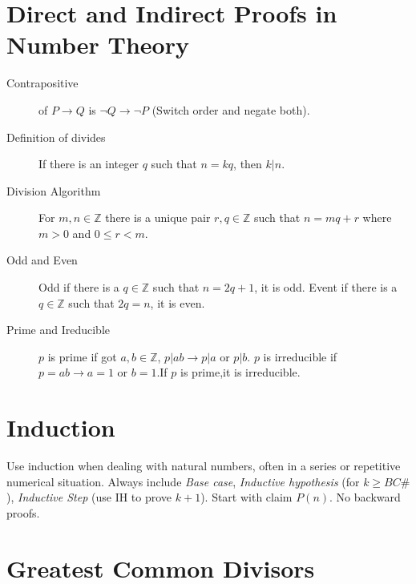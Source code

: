 \documentclass[../main.tex]{subfiles}
\begin{document}
\section{Direct and Indirect Proofs in Number Theory}
\label{sec:direct_and_indirect_proofs_in_number_theory}

\begin{description}
  \item[Contrapositive] of $P\to Q$ is $\neg Q \to \neg P$ (Switch order and
    negate both).
  \item[Definition of divides] If there is an integer $q$ such that $n=kq$,
    then $k|n$.
  \item[Division Algorithm] For $m,n\in\mathbb{Z} $ there is a unique pair
    $r,q\in\mathbb{Z}$ such that $n=mq+r$ where $m>0$ and $0 \leq r < m$.
  \item[Odd and Even] Odd if there is a $q\in\mathbb{Z}$ such that $n=2q+1$, it
    is odd. Event if there is a $q\in\mathbb{Z}$ such that $2q=n$, it is even.
  \item[Prime and Ireducible] $p$ is prime if got $a,b\in\mathbb{Z}$, $p|ab\to
    p|a \text { or } p|b$. $p$ is irreducible if $p=ab\to a=1\text{ or }b=1$.If
    $p$ is prime,it is irreducible.
\end{description}   

\section{Induction}
\label{sec:induction}

Use induction when dealing with natural numbers, often in a series or
repetitive numerical situation. Always include \textit{Base case},
\textit{Inductive hypothesis} (for $k\geq BC\#$), \textit{Inductive Step} (use
IH to prove $k+1$). Start with claim $P(n)$. No backward proofs.

\section{Greatest Common Divisors}
\label{sec:greatest_common_divisors}
\end{document}
